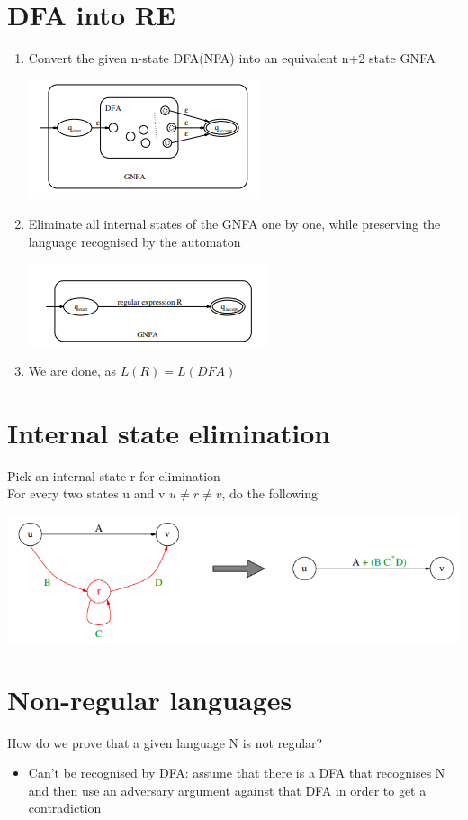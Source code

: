 \documentclass{article}[18pt]
\begin{document}
\section{DFA into RE}
\begin{enumerate}
	\item Convert the given n-state DFA(NFA) into an equivalent n+2 state GNFA
	\begin{center}
		\includegraphics[scale=0.7]{DFA->RE}
	\end{center}
	\item Eliminate all internal states of the GNFA one by one, while preserving the language recognised by the automaton
	\begin{center}
		\includegraphics[scale=0.7]{DFA->RE1}
	\end{center}
	\item We are done, as $L(R)=L(DFA)$
\end{enumerate}
\section{Internal state elimination}
Pick an internal state r for elimination\\
For every two states u and v $u\neq r\neq v$, do the following
\begin{center}
	\includegraphics[scale=0.7]{Elimination}
\end{center}
\section{Non-regular languages}
How do we prove that a given language N is not regular?
\begin{itemize}
	\item Can't be recognised by DFA: assume that there is a DFA that recognises N and then use an adversary argument against that DFA in order to get a contradiction
\end{itemize}
\end{document}
